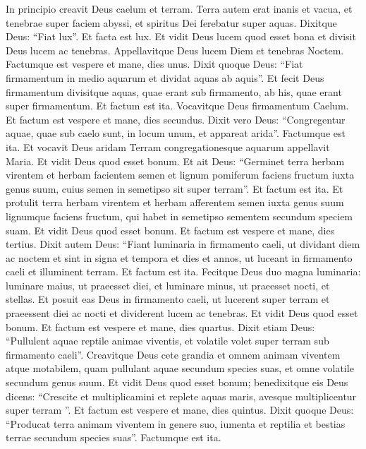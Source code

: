 \begin{biblechapter}
\verse In principio creavit Deus caelum et terram. 
\verse Terra autem erat inanis et vacua, et tenebrae super faciem abyssi, et spiritus Dei ferebatur super aquas.
 \verse Dixitque Deus: “Fiat lux”. Et facta est lux. 
\verse Et vidit Deus lucem quod esset bona et divisit Deus lucem ac tenebras. 
\verse Appellavitque Deus lucem Diem et tenebras Noctem. Factumque est vespere et mane, dies unus.
 \verse Dixit quoque Deus: “Fiat firmamentum in medio aquarum et dividat aquas ab aquis”. 
\verse Et fecit Deus firmamentum divisitque aquas, quae erant sub firmamento, ab his, quae erant super firmamentum. Et factum est ita. 
\verse Vocavitque Deus firmamentum Caelum. Et factum est vespere et mane, dies secundus.
 \verse Dixit vero Deus: “Congregentur aquae, quae sub caelo sunt, in locum unum, et appareat arida”. Factumque est ita. 
\verse Et vocavit Deus aridam Terram congregationesque aquarum appellavit Maria. Et vidit Deus quod esset bonum. 
 \verse Et ait Deus: “Germinet terra herbam virentem et herbam facientem semen et lignum pomiferum faciens fructum iuxta genus suum, cuius semen in semetipso sit super terram”. Et factum est ita. 
\verse Et protulit terra herbam virentem et herbam afferentem semen iuxta genus suum lignumque faciens fructum, qui habet in semetipso sementem secundum speciem suam. Et vidit Deus quod esset bonum. 
\verse Et factum est vespere et mane, dies tertius.
 \verse Dixit autem Deus: “Fiant luminaria in firmamento caeli, ut dividant diem ac noctem et sint in signa et tempora et dies et annos, 
\verse ut luceant in firmamento caeli et illuminent terram. Et factum est ita. 
\verse Fecitque Deus duo magna luminaria: luminare maius, ut praeesset diei, et luminare minus, ut praeesset nocti, et stellas. 
\verse Et posuit eas Deus in firmamento caeli, ut lucerent super terram 
\verse et praeessent diei ac nocti et dividerent lucem ac tenebras. Et vidit Deus quod esset bonum. 
\verse Et factum est vespere et mane, dies quartus.
 \verse Dixit etiam Deus: “Pullulent aquae reptile animae viventis, et volatile volet super terram sub firmamento caeli”. 
\verse Creavitque Deus cete grandia et omnem animam viventem atque motabilem, quam pullulant aquae secundum species suas, et omne volatile secundum genus suum. Et vidit Deus quod esset bonum; 
\verse benedixitque eis Deus dicens: “Crescite et multiplicamini et replete aquas maris, avesque multiplicentur super terram ”. 
\verse Et factum est vespere et mane, dies quintus.
 \verse Dixit quoque Deus: “Producat terra animam viventem in genere suo, iumenta et reptilia et bestias terrae secundum species suas”. Factumque est ita. 

\end{biblechapter}
